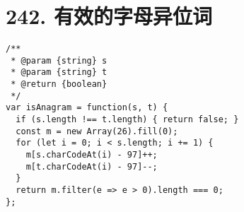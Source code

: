 \newpage
\section{242. 有效的字母异位词} 
\label{leetcode:242}

\begin{verbatim}
/**
 * @param {string} s
 * @param {string} t
 * @return {boolean}
 */
var isAnagram = function(s, t) {
  if (s.length !== t.length) { return false; }
  const m = new Array(26).fill(0);
  for (let i = 0; i < s.length; i += 1) {
    m[s.charCodeAt(i) - 97]++;
    m[t.charCodeAt(i) - 97]--;
  }
  return m.filter(e => e > 0).length === 0;
};
\end{verbatim}